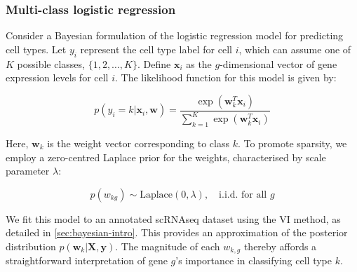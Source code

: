 
\subsubsection*{Multi-class logistic regression}

Consider a Bayesian formulation of the logistic regression model for predicting cell types. Let $y_i$ represent the cell type label for cell $i$, which can assume one of $K$ possible classes, $\{1, 2, \ldots, K\}$. Define $\mathbf{x}_i$ as the $g$-dimensional vector of gene expression levels for cell $i$. The likelihood function for this model is given by:

\begin{equation}
    \label{eq:logistic-regression-likelihood}
    p(y_i = k | \mathbf{x}_i, \mathbf{w}) = \frac{\exp(\mathbf{w}_{k}^T \mathbf{x}_i)}{\sum_{k=1}^{K} \exp(\mathbf{w}_{k}^T \mathbf{x}_i)}
\end{equation}

Here, $\mathbf{w}_k$ is the weight vector corresponding to class $k$. To promote sparsity, we employ a zero-centred Laplace prior for the weights, characterised by scale parameter $\lambda$:

\begin{equation}
    \label{eq:logistic-regression-prior}
    p(w_{kg}) \sim \text{Laplace}(0, \lambda),\quad\text{i.i.d. for all } g 
\end{equation}

We fit this model to an annotated \ac{scRNAseq} dataset using the \ac{VI} method, as detailed in \cref{sec:bayesian-intro}. This provides an approximation of the posterior distribution $p(\mathbf{w}_k | \mathbf{X}, \mathbf{y})$. The magnitude of each $w_{k,g}$ thereby affords a straightforward interpretation of gene $g$'s importance in classifying cell type $k$.


